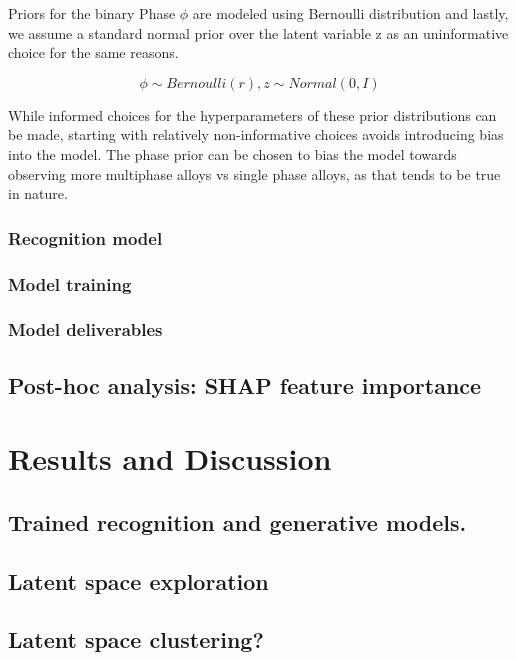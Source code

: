 \documentclass[a4paper]{article}
\begin{document}
Priors for the binary Phase $\phi$ are modeled using Bernoulli distribution and lastly, we assume a standard normal prior over the latent variable z as an uninformative choice for the same reasons.

\begin{equation}
    \phi \sim Bernoulli(r), z \sim Normal(0, I)
\end{equation}

While informed choices for the hyperparameters of these prior distributions can be made, starting with relatively non-informative choices  avoids introducing bias into the model. The phase prior can be chosen to bias the model towards observing more multiphase alloys vs single phase alloys, as that tends to be true in nature.

\subsubsection{Recognition model}
\subsubsection{Model training}
\subsubsection{Model deliverables}


\subsection{Post-hoc analysis: SHAP feature importance}

\section{Results and Discussion}

\subsection{Trained recognition and generative models.}

\subsection{Latent space exploration}

\subsection{Latent space clustering?}
\end{document}
